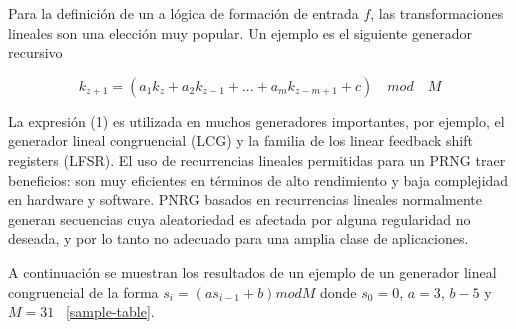 \documentclass{llncs}
\begin{document}
Para la definición de un a lógica de formación de entrada $f$, las transformaciones lineales son una elección muy popular. Un ejemplo es el siguiente generador recursivo 

\begin{equation}
k_{z+1}=  (a_{1}k_{z}+ a_{2}k_{z-1}+ ... + a_{m}k_{z-m+1}+c) \quad mod \quad M
\end{equation}

La expresión (1) es utilizada en muchos generadores importantes, por ejemplo, el generador lineal congruencial (LCG) y la familia de los  linear feedback shift registers (LFSR). El uso de recurrencias lineales  permitidas para un PRNG traer beneficios: son muy eficientes en términos de alto rendimiento y baja complejidad en hardware y software. PNRG basados en recurrencias lineales  normalmente generan secuencias cuya aleatoriedad es afectada por alguna regularidad no deseada, y por lo tanto no adecuado para una amplia clase de aplicaciones.

A continuación se muestran los resultados de un ejemplo de un generador lineal congruencial de la forma $s_{i}= (as_{i-1}+b)mod M$ donde $s_{0}=0$, $a=3$, $b-5$ y $M=31$ ~\ref{sample-table}.
\end{document}
